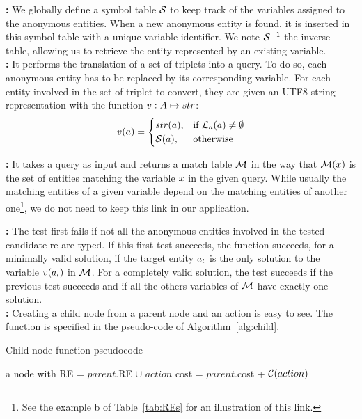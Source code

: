\textbf{\tovariable: }
We globally define a symbol table $\mathcal{S}$ to keep track of the variables assigned to the anonymous entities. When a new anonymous entity is found, it is inserted in this symbol table with a unique variable identifier. We note $\mathcal{S}^{-1}$ the inverse table, allowing us to retrieve the entity represented by an existing variable. \\

\textbf{\toquery: }
It performs the translation of a set of triplets into a \sparql{} query. To do so, each anonymous entity has to be replaced by its corresponding variable. For each entity involved in the set of triplet to convert, they are given an UTF8 string representation with the function $v: A \mapsto str$: 
\[ 
    v(a) = 
    \begin{cases}
        str(a),& \text{if } \mathcal{L}_a(a) \neq \emptyset\\
        \mathcal{S}(a),& \text{otherwise}
    \end{cases} 
\]

\textbf{\sparqlresult: }
It takes a \sparql{} query as input and returns a match table $\mathcal{M}$ in the way that $\mathcal{M}(x)$ is the set of entities matching the variable $x$ in the given query. While usually the matching entities of a given variable depend on the matching entities of another one\footnote{See the example b of Table~\ref{tab:REs} for an illustration of this link.}, we do not need to keep this link in our application.

\textbf{\goaltest: }
The test first fails if not all the anonymous entities involved in the tested candidate \acrshort{re} are typed. If this first test succeeds, the function succeeds, for a minimally valid solution, if the target entity $a_t$ is the only solution to the variable $v(a_t)$ in $\mathcal{M}$. For a completely valid solution, the test succeeds if the previous test succeeds and if all the others variables of $\mathcal{M}$ have exactly one solution. \\

\textbf{\createchild: } 
Creating a child node from a parent node and an action is easy to see. The \createchild function is specified in the pseudo-code of Algorithm~\ref{alg:child}. 

\begin{algorithm}[ht!]
\caption{\label{alg:child} Child node function pseudocode}
\begin{algorithmic}
    \State \Return a node with
    \State RE = $parent$.RE $\cup$ $action$
    \State cost = $parent$.cost + $\mathcal{C}(action)$
\EndFunction
\end{algorithmic}
\end{algorithm}

